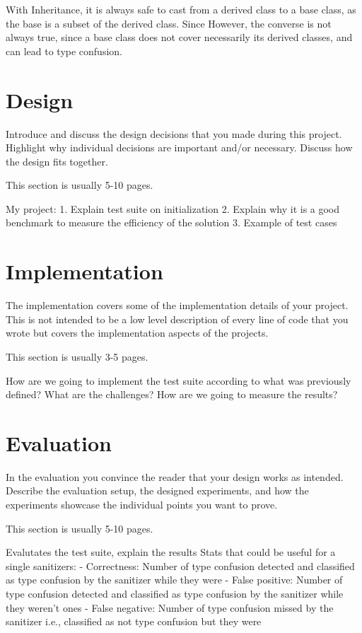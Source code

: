 \documentclass[a4paper,11pt,oneside]{report}
\begin{document}
With Inheritance, it is always safe to cast from a derived class to a base class, 
as the base is a subset of the derived class. Since However, the converse is not always true, since a base class does not cover necessarily its derived classes, 
and can lead to type confusion. 

\chapter{Design}

Introduce and discuss the design decisions that you made during this project.
Highlight why individual decisions are important and/or necessary. Discuss
how the design fits together.

This section is usually 5-10 pages.

My project:
1. Explain test suite on initialization 
2. Explain why it is a good benchmark to measure the efficiency of the solution
3. Example of test cases


\chapter{Implementation}

The implementation covers some of the implementation details of your project.
This is not intended to be a low level description of every line of code that
you wrote but covers the implementation aspects of the projects.

This section is usually 3-5 pages.

How are we going to implement the test suite according to what was previously defined? What are the challenges? 
How are we going to measure the results?


\chapter{Evaluation}

In the evaluation you convince the reader that your design works as intended.
Describe the evaluation setup, the designed experiments, and how the
experiments showcase the individual points you want to prove.

This section is usually 5-10 pages.

Evalutates the test suite, explain the results
Stats that could be useful for a single sanitizers:
- Correctness: Number of type confusion detected and classified as type confusion by the sanitizer while they were
- False positive: Number of type confusion detected and classified as type confusion by the sanitizer while they weren't ones
- False negative: Number of type confusion missed by the sanitizer i.e., classified as not type confusion but they were
\end{document}
